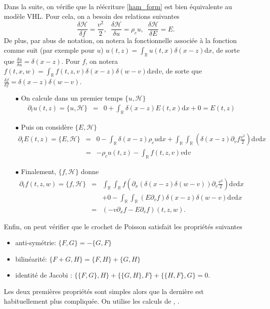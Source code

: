 Dans la suite, on vérifie que la réécriture \eqref{ham_form} est bien équivalente au modèle VHL. Pour cela, on a besoin des relations suivantes 
$$
  \frac{\delta \mathcal{H}}{\delta f} = \frac{v^2}{2}, \;\; \frac{\delta \mathcal{H}}{\delta u} = \rho_c u, \;\; \frac{\delta \mathcal{H}}{\delta E} = E. 
$$
De plus, par abus de notation, on notera la fonctionnelle associée à la fonction comme suit (par exemple pour $u$) $u(t, z)=\int_{\mathbb{R}} u(t, x)\delta(x-z) \mathrm{d}x$, de sorte que $ \frac{\delta u}{\delta u} = \delta(x-z)$. Pour $f$, on notera $f(t, x, w)=\int_{\mathbb{R}} f(t, z, v)\delta(x-z)\delta(w-v) \mathrm{d}x\mathrm{d}v$, de sorte que $ \frac{\delta f}{\delta f} = \delta(x-z)\delta(w-v)$.

\begin{enumerate}
  \item[$\bullet$] On calcule dans un premier temps $\{ u, \mathcal{H} \}$ 
    \begin{eqnarray*}
    \partial_t u(t, z) = \{ u, \mathcal{H} \} &=& 0+ \int_{\mathbb{R}}   \delta(x-z) E(t,x) \mathrm{d}x  + 0 = E(t,z)
    \end{eqnarray*}
  \item[$\bullet$] Puis on considère $\{ E, \mathcal{H} \}$ 
    \begin{eqnarray*}
    \partial_t E(t, z) = \{ E, \mathcal{H} \} &=& 0 -  \int_{\mathbb{R}}  \delta(x-z) \rho_c u \mathrm{d}x  +  \int_{\mathbb{R}}\int_{\mathbb{R}}  \left(  \delta(x-z)  \partial_v f \frac{v^2}{2}  \right) \mathrm{d}{ v}\mathrm{d}x \nonumber\\
    &=& - \rho_c u(t, z) - \int_{\mathbb{R}} f(t, z, v) v\mathrm{d}{ v} 
    \end{eqnarray*}
  \item[$\bullet$]  Finalement,  $\{ f, \mathcal{H} \}$ donne 
    \begin{eqnarray*}
    \partial_t f(t, z,w) = \{ f, \mathcal{H} \} &=&  \int_{\mathbb{R}}\int_{\mathbb{R}} f \left( \partial_x (\delta(x-z)\delta(w-v)) \partial_v \frac{v^2}{2}   \right)\mathrm{d}v \mathrm{d}x \nonumber\\
    && + 0  -  \int_{\mathbb{R}}\int_{\mathbb{R}}  \left( E  \partial_v f \right) \delta(x-z)  \delta(w-v)    \mathrm{d}{ v}\mathrm{d}x \nonumber\\
    &=& (- v\partial_x f - E\partial_v f)(t, z, w). 
    \end{eqnarray*}
\end{enumerate}

Enfin, on peut vérifier  que le crochet de Poisson satisfait les propriétés suivantes 
\begin{itemize}
  \item anti-symétrie: $\{ F, G \} = -\{ G, F \}$ 
  \item bilinéarité: $\{ F + G, H \} = \{ F, H \}+\{ G, H \}$ 
  \item identité de Jacobi : $\{\{ F, G \}, H\} + \{\{G,H\}, F \} + \{\{H, F\}, G \} = 0$.  
\end{itemize}
Les deux premières propriétés sont  simples alors que la dernière est habituellement plus compliquée. On utilise les calculs de \cite{Li:2020}, \cite{Morrison:2012}.




